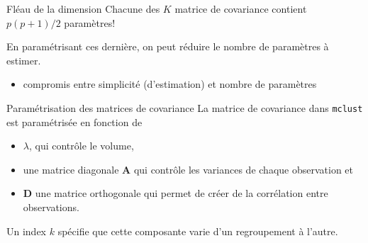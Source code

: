 \documentclass[
  ignorenonframetext,
]{beamer}
\providecommand{\tightlist}{%
  \setlength{\itemsep}{0pt}\setlength{\parskip}{0pt}}\usepackage{longtable,booktabs,array}
\begin{document}
\begin{frame}{Fléau de la dimension}
\protect\hypertarget{fluxe9au-de-la-dimension}{}
Chacune des \(K\) matrice de covariance contient \(p(p+1)/2\)
paramètres!

En paramétrisant ces dernière, on peut réduire le nombre de paramètres à
estimer.

\begin{itemize}
\tightlist
\item
  compromis entre simplicité (d'estimation) et nombre de paramètres
\end{itemize}
\end{frame}

\begin{frame}[fragile]{Paramétrisation des matrices de covariance}
\protect\hypertarget{paramuxe9trisation-des-matrices-de-covariance}{}
La matrice de covariance dans \texttt{mclust} est paramétrisée en
fonction de

\begin{itemize}
\tightlist
\item
  \(\lambda\), qui contrôle le volume,
\item
  une matrice diagonale \(\mathbf{A}\) qui contrôle les variances de
  chaque observation et
\item
  \(\mathbf{D}\) une matrice orthogonale qui permet de créer de la
  corrélation entre observations.
\end{itemize}

Un index \(k\) spécifie que cette composante varie d'un regroupement à
l'autre.
\end{frame}
\end{document}
